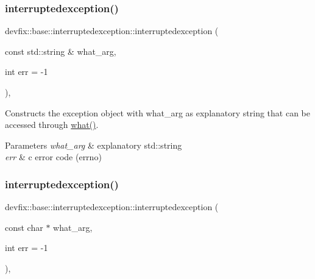 \subsubsection{\texorpdfstring{interruptedexception()}{interruptedexception()}\hspace{0.1cm}{\footnotesize\ttfamily [1/2]}}
{\footnotesize\ttfamily devfix\+::base\+::interruptedexception\+::interruptedexception (\begin{DoxyParamCaption}\item[{const std\+::string \&}]{what\+\_\+arg,  }\item[{int}]{err = {\ttfamily -\/1} }\end{DoxyParamCaption})\hspace{0.3cm}{\ttfamily [inline]}, {\ttfamily [explicit]}}

Constructs the exception object with what\+\_\+arg as explanatory string that can be accessed through \hyperlink{structdevfix_1_1base_1_1baseexception_a10cc739c08d7d38b89abea342824396f}{what()}. 
\begin{DoxyParams}{Parameters}
{\em what\+\_\+arg} & explanatory std\+::string \\
\hline
{\em err} & c error code (errno) \\
\hline
\end{DoxyParams}
\mbox{\label{structdevfix_1_1base_1_1interruptedexception_a3115c6a0ad2a463d04629df99ec4d119}} 
\subsubsection{\texorpdfstring{interruptedexception()}{interruptedexception()}\hspace{0.1cm}{\footnotesize\ttfamily [2/2]}}
{\footnotesize\ttfamily devfix\+::base\+::interruptedexception\+::interruptedexception (\begin{DoxyParamCaption}\item[{const char $\ast$}]{what\+\_\+arg,  }\item[{int}]{err = {\ttfamily -\/1} }\end{DoxyParamCaption})\hspace{0.3cm}{\ttfamily [inline]}, {\ttfamily [explicit]}}

